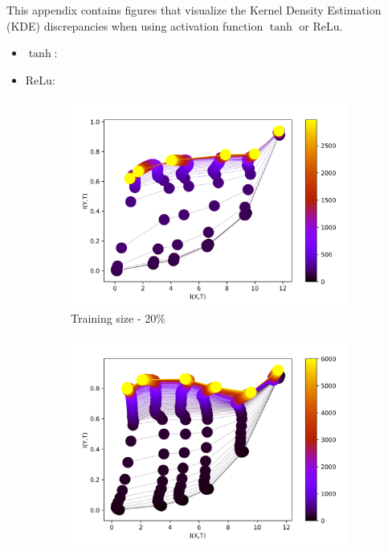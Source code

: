 \documentclass[dissertation.tex]{subfiles}
\begin{document}
This appendix contains figures that visualize the Kernel Density Estimation
(KDE) discrepancies when using activation function $\tanh$ or ReLu.
\begin{itemize}
  \item{
      $\tanh$:
    }
  \item{
      ReLu:
    }
\end{itemize}

\begin{figure}[ht]
  \centering
  \begin{subfigure}[t]{0.32\textwidth}
    \centering
    \includegraphics[width=\textwidth]{figs/eval/trainingSize/KDE20.png}
    \caption{
      Training size - 20\%
    }
    \label{figKDETS20}
  \end{subfigure}
  \begin{subfigure}[t]{0.32\textwidth}
    \centering
    \includegraphics[width=\textwidth]{figs/eval/trainingSize/KDE40.png}

\end{subfigure}
\end{figure}
\end{document}
